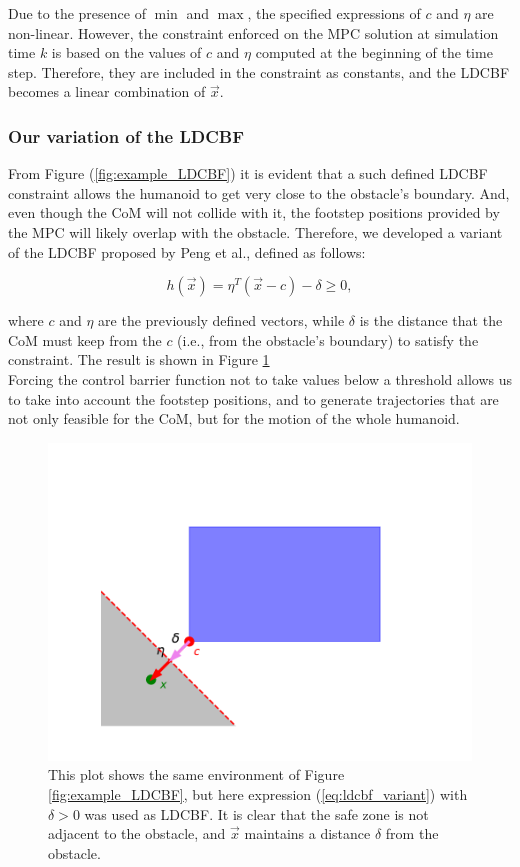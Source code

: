 \documentclass[main.tex]{subfiles}
\begin{document}
Due to the presence of $\min$ and $\max$, the specified expressions of $c$ and $\eta$ are non-linear. However, the constraint enforced on the MPC solution at simulation time $k$ is based on the values of $c$ and $\eta$ computed at the beginning of the time step. Therefore, they are included in the constraint as constants, and the LDCBF becomes a linear combination of $\vec{x}$.

\subsubsection{Our variation of the LDCBF}
From Figure (\ref{fig:example_LDCBF}) it is evident that a such defined LDCBF constraint allows the humanoid to get very close to the obstacle's boundary. And, even though the CoM will not collide with it, the footstep positions provided by the MPC will likely overlap with the obstacle. Therefore, we developed a variant of the LDCBF proposed by Peng et al., defined as follows:

\begin{equation} \label{eq:ldcbf_variant}
h\left(\vec{x}\right) = \eta^T \left(\vec{x} - c\right) - \delta \geq 0,
\end{equation}

where $c$ and $\eta$ are the previously defined vectors, while $\delta$ is the distance that the CoM must keep from the $c$ (i.e., from the obstacle's boundary) to satisfy the constraint. The result is shown in Figure \ref{fig:example_LDCBF_variant}\\
Forcing the control barrier function not to take values below a threshold allows us to take into account the footstep positions, and to generate trajectories that are not only feasible for the CoM, but for the motion of the whole humanoid.

\begin{figure}[h]
    \centering
    \includegraphics[width=0.75\linewidth]{figures//MPC/example_ldcbf_variant.pdf}
    \caption{This plot shows the same environment of Figure \ref{fig:example_LDCBF}, but here expression (\ref{eq:ldcbf_variant}) with $\delta > 0$ was used as LDCBF. It is clear that the safe zone is not adjacent to the obstacle, and $\vec{x}$ maintains a distance $\delta$ from the obstacle.}
    \label{fig:example_LDCBF_variant}
\end{figure}
\end{document}
